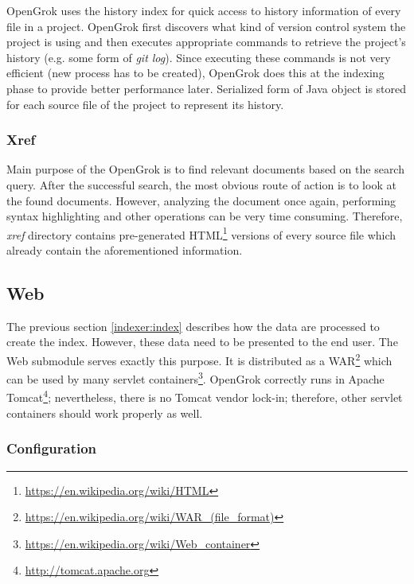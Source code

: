 OpenGrok uses the history index for quick access to history information of every file in a project. OpenGrok first discovers
what kind of version control system the project is using and then executes appropriate commands to retrieve the project's
history (e.g. some form of \textit{git log}). Since executing these commands is not very efficient (new process has to
be created), OpenGrok does this at the indexing phase to provide better performance later. Serialized form of Java object
is stored for each source file of the project to represent its history.

\subsubsection{Xref}
\label{indexer:xref}

Main purpose of the OpenGrok is to find relevant documents based on the search query. After the successful search, the most
obvious route of action is to look at the found documents. However, analyzing the document once again, performing syntax
highlighting and other operations can be very time consuming. Therefore, \textit{xref} directory contains pre-generated
HTML\footnote{\url{https://en.wikipedia.org/wiki/HTML}} versions of every source file which already contain the
aforementioned information.

\subsection{Web}
\label{opengrok-web}

The previous section \ref{indexer:index} describes how the data are processed to create the index. However, these data need
to be presented to the end user. The Web submodule serves exactly this purpose. It is distributed as a
WAR\footnote{\url{https://en.wikipedia.org/wiki/WAR\_(file\_format)}} which can be used by many
servlet containers\footnote{\url{https://en.wikipedia.org/wiki/Web\_container}}. OpenGrok correctly runs in
Apache Tomcat\footnote{\url{http://tomcat.apache.org}}; nevertheless, there is no Tomcat vendor lock-in; therefore,
other servlet containers should work properly as well.

\subsubsection{Configuration}
\label{opengrok_configuration}


